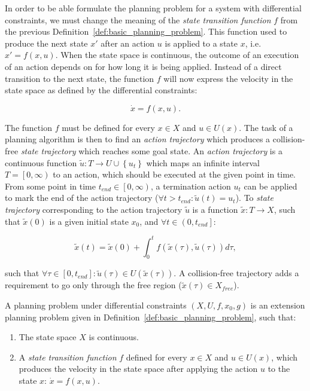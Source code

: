 In order to be able formulate the planning problem for a system with differential constraints, we must change the meaning of the \textit{state transition function} $f$ from the previous Definition~\ref{def:basic_planning_problem}. This function used to produce the next state $x'$ after an action $u$ is applied to a state $x$, i.e. $x'=f(x, u)$. When the state space is continuous, the outcome of an execution of an action depends on for how long it is being applied. Instead of a direct transition to the next state, the function $f$ will now express the velocity in the state space as defined by the differential constraints:

\[
	\dot{x}=f(x, u).
\]

The function $f$ must be defined for every $x\in X$ and $u\in U(x)$. The task of a planning algorithm is then to find an \textit{action trajectory} which produces a collision-free \textit{state trajectory} which reaches some goal state. An \textit{action trajectory} is a continuous function $\tilde{u}: T \rightarrow U\cup\left\{u_t\right\}$ which maps an infinite interval $T=\left[0, \infty\right)$ to an action, which should be executed at the given point in time. From some point in time $t_{end}\in\left[0, \infty\right)$, a termination action $u_t$ can be applied to mark the end of the action trajectory ($\forall t>t_{end}: \tilde{u}(t)=u_t$). To \textit{state trajectory} corresponding to the action trajectory $\tilde{u}$ is a function $\tilde{x}: T \rightarrow X$, such that $\tilde{x}(0)$ is a given initial state $x_0$, and $\forall t \in \left(0, t_{end}\right]$:

\begin{equation}
	\label{eq:integrate_state_trajectory}
	\tilde{x}(t) = \tilde{x}(0) + \int_0^t f(\tilde{x}(\tau), \tilde{u}(\tau)) d\tau,
\end{equation}

such that $\forall \tau\in\left[0, t_{end}\right]: \tilde{u}(\tau)\in U(\tilde{x}(\tau))$. A collision-free trajectory adds a requirement to go only through the free region ($\tilde{x}(\tau)\in X_{free}$).

\begin{defn}
	\label{def:planning_problem_under_differential_constraints}
	A planning problem under differential constraints $\left(X, U, f, x_0, g\right)$ is an extension planning problem given in Definition~\ref{def:basic_planning_problem}, such that:
	
	\begin{enumerate}
		\item The state space $X$ is continuous.
		\item A \textit{state transition function} $f$ defined for every $x\in X$ and $u\in U(x)$, which produces the velocity in the state space after applying the action $u$ to the state $x$: $\dot{x}=f(x, u)$.
	\end{enumerate}
\end{defn}

